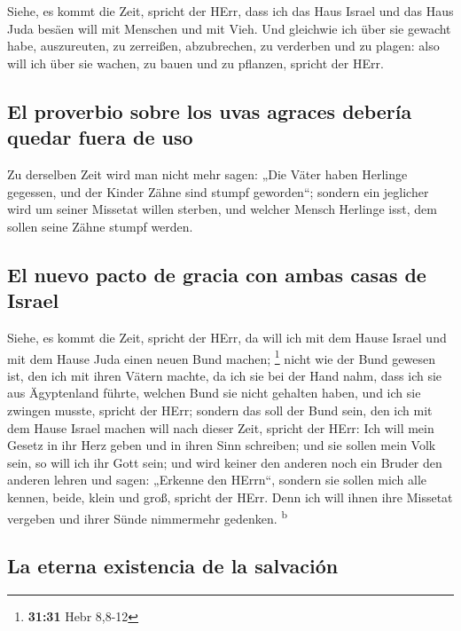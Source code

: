  Siehe, es kommt die Zeit, spricht der HErr, dass ich das
Haus Israel und das Haus Juda besäen will mit Menschen und mit Vieh.
 Und gleichwie ich über sie gewacht habe, auszureuten, zu
zerreißen, abzubrechen, zu verderben und zu plagen: also will ich über
sie wachen, zu bauen und zu pflanzen, spricht der HErr.

\hypertarget{el-proverbio-sobre-los-uvas-agraces-deberuxeda-quedar-fuera-de-uso}{%
\subsection{El proverbio sobre los uvas agraces debería quedar fuera de
uso}\label{el-proverbio-sobre-los-uvas-agraces-deberuxeda-quedar-fuera-de-uso}}

 Zu derselben Zeit wird man nicht mehr sagen: „Die Väter
haben Herlinge gegessen, und der Kinder Zähne sind stumpf geworden``;
 sondern ein jeglicher wird um seiner Missetat willen
sterben, und welcher Mensch Herlinge isst, dem sollen seine Zähne stumpf
werden.

\hypertarget{el-nuevo-pacto-de-gracia-con-ambas-casas-de-israel}{%
\subsection{El nuevo pacto de gracia con ambas casas de
Israel}\label{el-nuevo-pacto-de-gracia-con-ambas-casas-de-israel}}

 Siehe, es kommt die Zeit, spricht der HErr, da will ich
mit dem Hause Israel und mit dem Hause Juda einen neuen Bund machen;
\footnote{\textbf{31:31} Hebr 8,8-12}  nicht wie der Bund
gewesen ist, den ich mit ihren Vätern machte, da ich sie bei der Hand
nahm, dass ich sie aus Ägyptenland führte, welchen Bund sie nicht
gehalten haben, und ich sie zwingen musste, spricht der HErr;
 sondern das soll der Bund sein, den ich mit dem Hause
Israel machen will nach dieser Zeit, spricht der HErr: Ich will mein
Gesetz in ihr Herz geben und in ihren Sinn schreiben; und sie sollen
mein Volk sein, so will ich ihr Gott sein;  und wird
keiner den anderen noch ein Bruder den anderen lehren und sagen:
„Erkenne den HErrn``, sondern sie sollen mich alle kennen, beide, klein
und groß, spricht der HErr. Denn ich will ihnen ihre Missetat vergeben
und ihrer Sünde nimmermehr gedenken. \textsuperscript{b}

\hypertarget{la-eterna-existencia-de-la-salvaciuxf3n}{%
\subsection{La eterna existencia de la
salvación}\label{la-eterna-existencia-de-la-salvaciuxf3n}}

